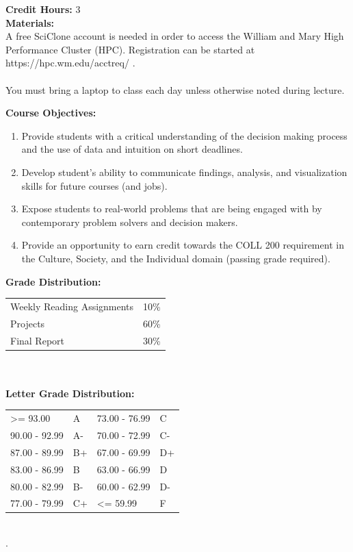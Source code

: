 \documentclass[11pt]{article}
\begin{document}
\textbf {Credit Hours:} 3 \\

\textbf {\large Materials:}\\ 
A free SciClone account is needed in order to access the William and Mary High Performance Cluster (HPC).  Registration can be started at https://hpc.wm.edu/acctreq/ . \\
\\
You must bring a laptop to class  each day unless otherwise noted during lecture.


\vspace{8mm}

\textbf {\large Course Objectives:} 
\begin{enumerate} \itemsep-0.4em
  \item Provide students with a critical understanding of the decision making process and the use of data and intuition on short deadlines.
  \item Develop student’s ability to communicate findings, analysis, and visualization skills for future courses (and jobs).
  \item Expose students to real-world problems that are being engaged with by contemporary problem solvers and decision makers.
  \item Provide an opportunity to earn credit towards the COLL 200 requirement in the Culture, Society, and the Individual domain (passing grade required).
\end{enumerate}
\vspace{8mm}

\textbf {\large Grade Distribution:} \\
\hspace*{40mm}
\begin{tabular}{ l l }
Weekly Reading Assignments & 10\% \\
Projects & 60\% \\
Final Report & 30\%\\
\end{tabular} \\\\

\textbf {\large Letter Grade Distribution:} \\
\hspace*{40mm}
\begin{tabular}{ l l | l l }
\textgreater= 93.00 & A & 73.00 - 76.99 & C \\
90.00 - 92.99 & A-  & 70.00 - 72.99 & C- \\
87.00 - 89.99 & B+  & 67.00 - 69.99 & D+ \\
83.00 - 86.99 & B  & 63.00 - 66.99 & D \\
80.00 - 82.99 & B-  & 60.00 - 62.99 & D- \\
77.00 - 79.99 & C+  & \textless= 59.99 & F \\
\end{tabular} \\
.\\
\end{document}
